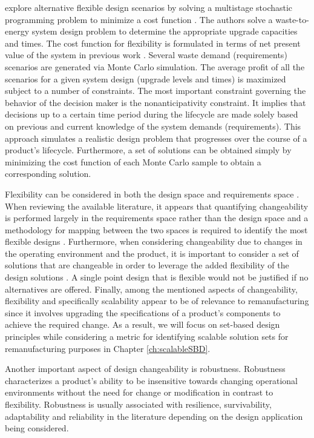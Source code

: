 \citeauthor{Cardin2017} explore alternative flexible design scenarios by solving a multistage stochastic programming problem to minimize a cost function \cite{Cardin2017}. The authors solve a waste-to-energy system design problem to determine the appropriate upgrade capacities and times. The cost function for flexibility is formulated in terms of net present value of the system in previous work \cite{Cardin2016}. Several waste demand (requirements) scenarios are generated via Monte Carlo simulation. The average profit of all the scenarios for a given system design (upgrade levels and times) is maximized subject to a number of constraints. The most important constraint governing the behavior of the decision maker is the nonanticipativity constraint. It implies that decisions up to a certain time period during the lifecycle are made solely based on previous and current knowledge of the system demands (requirements). This approach simulates a realistic design problem that progresses over the course of a product's lifecycle. Furthermore, a set of solutions can be obtained simply by minimizing the cost function of each Monte Carlo sample to obtain a corresponding solution.

Flexibility can be considered in both the design space and requirements space \cite{Ferguson2008}. When reviewing the available literature, it appears that quantifying changeability is performed largely in the requirements space rather than the design space and a methodology for mapping between the two spaces is required to identify the most flexible designs \cite{Tackett2014,Olewnik2004,Liu2008,Yannou2003}. Furthermore, when considering changeability due to changes in the operating environment and the product, it is important to consider a set of solutions that are changeable in order to leverage the added flexibility of the design solutions \cite{Olewnik2004,Liu2008,Suh2007}. A single point design that is flexible would not be justified if no alternatives are offered. Finally, among the mentioned aspects of changeability, flexibility and specifically scalability appear to be of relevance to remanufacturing since it involves upgrading the specifications of a product's components to achieve the required change. As a result, we will focus on set-based design principles while considering a metric for identifying scalable solution sets for remanufacturing purposes in Chapter \ref{ch:scalableSBD}.

Another important aspect of design changeability is robustness. Robustness characterizes a product's ability to be insensitive towards changing operational environments without the need for change or modification in contrast to flexibility. Robustness is usually associated with resilience, survivability, adaptability and reliability in the literature depending on the design application being considered. 

